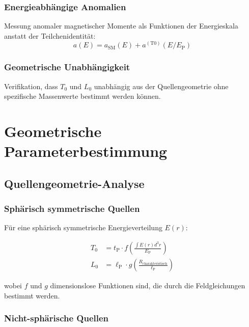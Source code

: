 \documentclass[12pt,a4paper]{article}
\newcommand{\Tzero}{T_0}
\newcommand{\lP}{\ell_{\text{P}}}
\newcommand{\tP}{t_{\text{P}}}
\newcommand{\EP}{E_{\text{P}}}
\begin{document}
	\subsubsection{Energieabhängige Anomalien}
	
	Messung anomaler magnetischer Momente als Funktionen der Energieskala anstatt der Teilchenidentität:
	\begin{equation}
		a(E) = a_{\text{SM}}(E) + a^{(\text{T0})}(E/\EP)
		\label{eq:energy_dependent_anomaly}
	\end{equation}
	
	\subsubsection{Geometrische Unabhängigkeit}
	
	Verifikation, dass $\Tzero$ und $L_0$ unabhängig aus der Quellengeometrie ohne spezifische Massenwerte bestimmt werden können.
	
	\section{Geometrische Parameterbestimmung}
	\label{sec:geometric_parameters}
	
	\subsection{Quellengeometrie-Analyse}
	\label{subsec:source_geometry}
	
	\subsubsection{Sphärisch symmetrische Quellen}
	
	Für eine sphärisch symmetrische Energieverteilung $E(r)$:
	
	\begin{align}
		\Tzero &= \tP \cdot f\left(\frac{\int E(r) d^3r}{\EP}\right) \\
		L_0 &= \lP \cdot g\left(\frac{R_{\text{charakteristisch}}}{\lP}\right)
	\end{align}
	
	wobei $f$ und $g$ dimensionslose Funktionen sind, die durch die Feldgleichungen bestimmt werden.
	
	\subsubsection{Nicht-sphärische Quellen}
	
\end{document}
